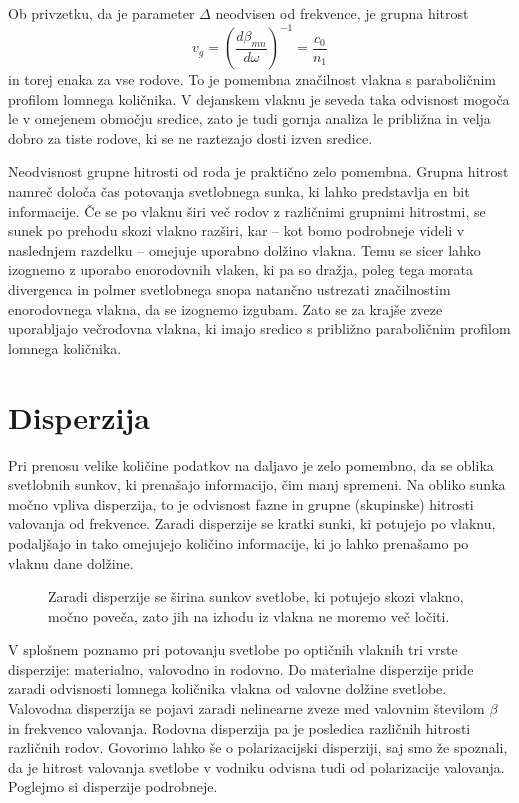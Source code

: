 Ob privzetku, da je parameter $\Delta$ neodvisen od frekvence, je grupna 
hitrost
\begin{equation}
v_{g}=\left(\frac{d\beta_{mn}}{d\omega}\right)^{-1}=\frac{c_{0}}{n_{1}}
\label{9.21}
\end{equation}
in torej enaka za vse rodove. To je pomembna značilnost vlakna s paraboličnim profilom
lomnega količnika. V dejanskem vlaknu je seveda taka odvisnost mogoča
le v omejenem območju sredice, zato je tudi gornja analiza le približna
in velja dobro za tiste rodove, ki se ne raztezajo dosti izven sredice.

Neodvisnost grupne hitrosti od roda je praktično zelo pomembna. 
Grupna hitrost namreč določa čas potovanja svetlobnega sunka, ki
lahko predstavlja en bit informacije. Če se po vlaknu širi več
rodov z različnimi grupnimi hitrostmi, se sunek po prehodu skozi
vlakno razširi, kar -- kot bomo podrobneje videli v naslednjem razdelku -- omejuje 
uporabno dolžino vlakna. Temu se sicer lahko izognemo z uporabo enorodovnih vlaken,
ki pa so dražja, poleg tega morata divergenca in polmer svetlobnega snopa 
natančno ustrezati značilnostim enorodovnega vlakna, da se izognemo izgubam. 
Zato se za krajše zveze uporabljajo večrodovna vlakna, ki imajo sredico s 
približno paraboličnim profilom lomnega količnika.

\section{Disperzija}
\label{chap:Disperzija}
Pri prenosu velike količine podatkov na daljavo je zelo pomembno, da
se oblika svetlobnih sunkov, ki prenašajo informacijo, čim manj spremeni.
Na obliko sunka močno vpliva disperzija, to je odvisnost fazne in grupne (skupinske) hitrosti
valovanja od frekvence. Zaradi disperzije se kratki sunki, ki potujejo po vlaknu, podaljšajo in 
tako omejujejo količino informacije, ki jo lahko prenašamo po vlaknu dane dolžine.
\begin{figure}[h]
\centering
\def\svgwidth{120truemm} 
 
\caption{Zaradi disperzije se širina sunkov svetlobe, ki potujejo skozi vlakno, 
močno poveča, zato jih na izhodu iz vlakna ne moremo več ločiti.}
\label{fig:disp}
\end{figure}

V splošnem poznamo pri potovanju svetlobe po optičnih vlaknih tri 
vrste disperzije: materialno, valovodno in rodovno. 
Do materialne disperzije pride zaradi odvisnosti lomnega količnika vlakna od 
valovne dolžine svetlobe. Valovodna disperzija se pojavi zaradi nelinearne zveze 
med valovnim številom $\beta$ in frekvenco valovanja. Rodovna
disperzija pa je posledica različnih hitrosti različnih rodov. Govorimo lahko še o 
polarizacijski disperziji, saj smo že spoznali, da je hitrost valovanja svetlobe 
v vodniku odvisna tudi od polarizacije valovanja. Poglejmo si disperzije podrobneje. 


